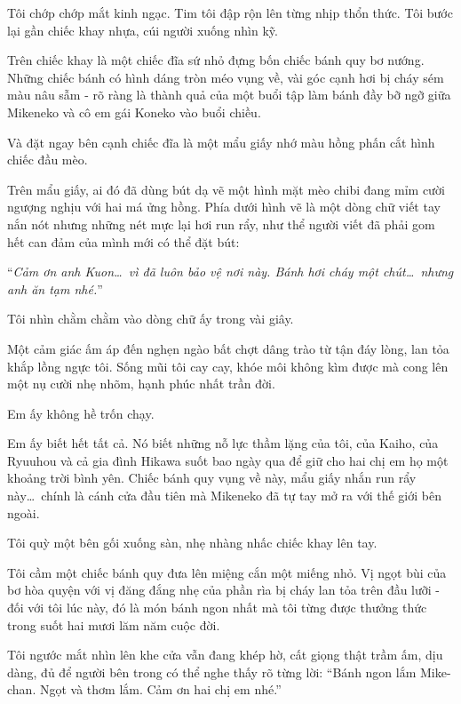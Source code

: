 \documentclass[../main.tex]{subfiles}
\begin{document}
Tôi chớp chớp mắt kinh ngạc. Tim tôi đập rộn lên từng nhịp thổn thức. Tôi bước lại gần chiếc khay nhựa, cúi người xuống nhìn kỹ.

Trên chiếc khay là một chiếc đĩa sứ nhỏ đựng bốn chiếc bánh quy bơ nướng. Những chiếc bánh có hình dáng tròn méo vụng về, vài góc cạnh hơi bị cháy sém màu nâu sẫm - rõ ràng là thành quả của một buổi tập làm bánh đầy bỡ ngỡ giữa Mikeneko và cô em gái Koneko vào buổi chiều.

Và đặt ngay bên cạnh chiếc đĩa là một mẩu giấy nhớ màu hồng phấn cắt hình chiếc đầu mèo.

Trên mẩu giấy, ai đó đã dùng bút dạ vẽ một hình mặt mèo chibi đang mỉm cười ngượng nghịu với hai má ửng hồng. Phía dưới hình vẽ là một dòng chữ viết tay nắn nót nhưng những nét mực lại hơi run rẩy, như thể người viết đã phải gom hết can đảm của mình mới có thể đặt bút:

\begin{center}
  ``\textit{Cảm ơn anh Kuon\dots\ vì đã luôn bảo vệ nơi này. Bánh hơi cháy một chút\dots\ nhưng anh ăn tạm nhé.}''
\end{center}

Tôi nhìn chằm chằm vào dòng chữ ấy trong vài giây.

Một cảm giác ấm áp đến nghẹn ngào bất chợt dâng trào từ tận đáy lòng, lan tỏa khắp lồng ngực tôi. Sống mũi tôi cay cay, khóe môi không kìm được mà cong lên một nụ cười nhẹ nhõm, hạnh phúc nhất trần đời.

Em ấy không hề trốn chạy.

Em ấy biết hết tất cả. Nó biết những nỗ lực thầm lặng của tôi, của Kaiho, của Ryuuhou và cả gia đình Hikawa suốt bao ngày qua để giữ cho hai chị em họ một khoảng trời bình yên. Chiếc bánh quy vụng về này, mẩu giấy nhắn run rẩy này\dots\ chính là cánh cửa đầu tiên mà Mikeneko đã tự tay mở ra với thế giới bên ngoài.

Tôi quỳ một bên gối xuống sàn, nhẹ nhàng nhấc chiếc khay lên tay.

Tôi cầm một chiếc bánh quy đưa lên miệng cắn một miếng nhỏ. Vị ngọt bùi của bơ hòa quyện với vị đăng đắng nhẹ của phần rìa bị cháy lan tỏa trên đầu lưỡi - đối với tôi lúc này, đó là món bánh ngon nhất mà tôi từng được thưởng thức trong suốt hai mươi lăm năm cuộc đời.

Tôi ngước mắt nhìn lên khe cửa vẫn đang khép hờ, cất giọng thật trầm ấm, dịu dàng, đủ để người bên trong có thể nghe thấy rõ từng lời: ``Bánh ngon lắm Mike-chan. Ngọt và thơm lắm. Cảm ơn hai chị em nhé.''
\end{document}

